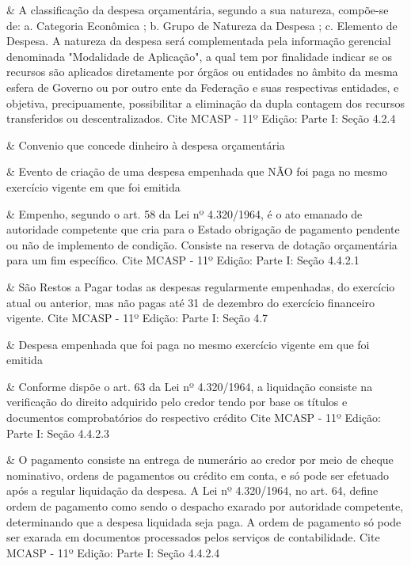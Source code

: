  &
A classificação da despesa orçamentária, segundo a sua natureza, compõe-se de: a. Categoria Econômica ; b. Grupo de Natureza da Despesa ; c. Elemento de Despesa. A natureza da despesa será complementada pela informação gerencial denominada "Modalidade de Aplicação", a qual tem por finalidade indicar se os recursos são aplicados diretamente por órgãos ou entidades no âmbito da mesma esfera de Governo ou por outro ente da Federação e suas respectivas entidades, e objetiva, precipuamente, possibilitar a eliminação da dupla contagem dos recursos transferidos ou descentralizados. Cite MCASP - 11º Edição: Parte I: Seção 4.2.4 
\\ \hline

 &
Convenio que concede dinheiro à despesa orçamentária 
\\ \hline

 &
Evento de criação de uma despesa empenhada que NÃO foi paga no mesmo exercício vigente em que foi emitida 
\\ \hline

 &
Empenho, segundo o art. 58 da Lei nº 4.320/1964, é o ato emanado de autoridade competente que cria para o Estado obrigação de pagamento pendente ou não de implemento de condição. Consiste na reserva de dotação orçamentária para um fim específico. Cite MCASP - 11º Edição: Parte I: Seção 4.4.2.1 
\\ \hline

 &
São Restos a Pagar todas as despesas regularmente empenhadas, do exercício atual ou anterior, mas não pagas até 31 de dezembro do exercício financeiro vigente. Cite MCASP - 11º Edição: Parte I: Seção 4.7 
\\ \hline

 &
Despesa empenhada que foi paga no mesmo exercício vigente em que foi emitida 
\\ \hline

 &
Conforme dispõe o art. 63 da Lei nº 4.320/1964, a liquidação consiste na verificação do direito adquirido pelo credor tendo por base os títulos e documentos comprobatórios do respectivo crédito Cite MCASP - 11º Edição: Parte I: Seção 4.4.2.3 
\\ \hline

 &
O pagamento consiste na entrega de numerário ao credor por meio de cheque nominativo, ordens de pagamentos ou crédito em conta, e só pode ser efetuado após a regular liquidação da despesa. A Lei nº 4.320/1964, no art. 64, define ordem de pagamento como sendo o despacho exarado por autoridade competente, determinando que a despesa liquidada seja paga. A ordem de pagamento só pode ser exarada em documentos processados pelos serviços de contabilidade. Cite MCASP - 11º Edição: Parte I: Seção 4.4.2.4 
\\ \hline

